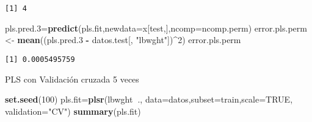 \documentclass[]{article}
\newenvironment{Shaded}{\begin{snugshade}}{\end{snugshade}}
\newcommand{\KeywordTok}[1]{\textcolor[rgb]{0.13,0.29,0.53}{\textbf{#1}}}
\newcommand{\DataTypeTok}[1]{\textcolor[rgb]{0.13,0.29,0.53}{#1}}
\newcommand{\DecValTok}[1]{\textcolor[rgb]{0.00,0.00,0.81}{#1}}
\newcommand{\StringTok}[1]{\textcolor[rgb]{0.31,0.60,0.02}{#1}}
\newcommand{\OtherTok}[1]{\textcolor[rgb]{0.56,0.35,0.01}{#1}}
\newcommand{\OperatorTok}[1]{\textcolor[rgb]{0.81,0.36,0.00}{\textbf{#1}}}
\newcommand{\NormalTok}[1]{#1}
\begin{document}
\begin{verbatim}
[1] 4
\end{verbatim}

\begin{Shaded}
\begin{Highlighting}[]
\NormalTok{pls.pred.}\DecValTok{3}\NormalTok{=}\KeywordTok{predict}\NormalTok{(pls.fit,}\DataTypeTok{newdata=}\NormalTok{x[test,],}\DataTypeTok{ncomp=}\NormalTok{ncomp.perm)}
\NormalTok{error.pls.perm <-}\StringTok{ }\KeywordTok{mean}\NormalTok{((pls.pred.}\DecValTok{3} \OperatorTok{-}\StringTok{ }\NormalTok{datos.test[, }\StringTok{"lbwght"}\NormalTok{])}\OperatorTok{^}\DecValTok{2}\NormalTok{)}
\NormalTok{error.pls.perm}
\end{Highlighting}
\end{Shaded}

\begin{verbatim}
[1] 0.0005495759
\end{verbatim}

PLS con Validación cruzada 5 veces

\begin{Shaded}
\begin{Highlighting}[]
\KeywordTok{set.seed}\NormalTok{(}\DecValTok{100}\NormalTok{)}
\NormalTok{pls.fit=}\KeywordTok{plsr}\NormalTok{(lbwght}\OperatorTok{~}\NormalTok{., }\DataTypeTok{data=}\NormalTok{datos,}\DataTypeTok{subset=}\NormalTok{train,}\DataTypeTok{scale=}\OtherTok{TRUE}\NormalTok{, }\DataTypeTok{validation=}\StringTok{"CV"}\NormalTok{)}
\KeywordTok{summary}\NormalTok{(pls.fit)}
\end{Highlighting}
\end{Shaded}
\end{document}
